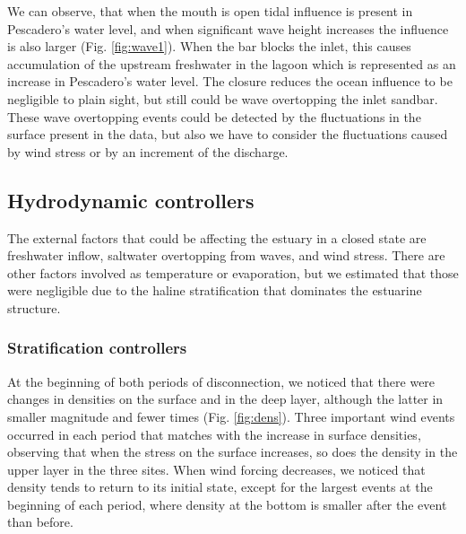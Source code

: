 \documentclass[tesis.tex]{subfiles}
\begin{document}
We can observe, that when the mouth is open tidal influence is present in Pescadero's water level, and when significant wave height increases the influence is also larger (Fig. \ref{fig:wave1}). When the bar blocks the inlet, this causes accumulation of the upstream freshwater in the lagoon which is represented as an increase in Pescadero's water level. The closure reduces the ocean influence to be negligible to plain sight, but still could be wave overtopping the inlet sandbar. These wave overtopping events could be detected by the fluctuations in the surface present in the data, but also we have to consider the fluctuations caused by wind stress or by an increment of the discharge.\\

\subsection{Hydrodynamic controllers}

The external factors that could be affecting the estuary in a closed state are freshwater inflow, saltwater overtopping from waves, and wind stress. There are other factors involved as temperature or evaporation, but we estimated that those were negligible due to the haline stratification that dominates the estuarine structure.\\

\subsubsection{Stratification controllers}

At the beginning of both periods of disconnection, we noticed that there were changes in densities on the surface and in the deep layer, although the latter in smaller magnitude and fewer times (Fig. \ref{fig:dens}). Three important wind events occurred in each period that matches with the increase in surface densities, observing that when the stress on the surface increases, so does the density in the upper layer in the three sites. When wind forcing decreases, we noticed that density tends to return to its initial state, except for the largest events at the beginning of each period, where density at the bottom is smaller after the event than before.\\
\end{document}

